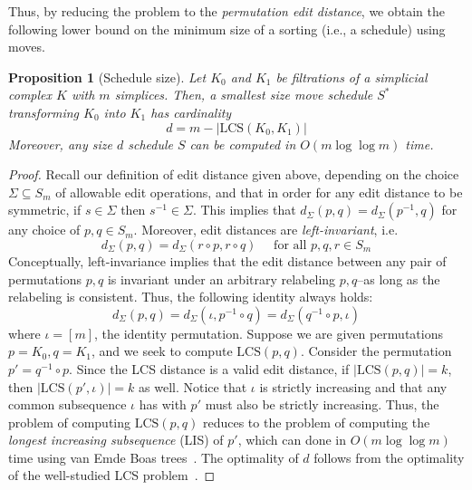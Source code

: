 \documentclass{article} %
\newtheorem{proposition}{Proposition}
\newtheorem{proof}{Proof}
\begin{document}
%
Thus, by reducing the problem to the \emph{permutation edit distance}, we obtain the following lower bound on the minimum size of a sorting (i.e., a schedule) using moves. 
\begin{proposition}[Schedule size]
Let $K_0$ and $ K_1$ be filtrations of a simplicial complex $K$ with  $m$ simplices.
Then, a smallest size  move schedule $S^*$ transforming $K_0$ into $K_1$ has cardinality 
$$ d = m - \lvert \mathrm{LCS}(K_0, K_1) \rvert $$ 
Moreover, any size $d$ schedule $S$ can be computed in $O(m \log \log m)$ time. 
\end{proposition}
\begin{proof}
Recall our definition of  edit distance given above, 
depending on the choice   $\Sigma \subseteq S_m$ of allowable edit operations, and that in order for any edit distance to be symmetric, if $s \in \Sigma$ then $s^{-1} \in \Sigma$. This implies that $d_\Sigma(p,q) = d_\Sigma(p^{-1}, q)$ for any choice of  $p,q \in S_m$. 
Moreover, edit distances are \emph{left-invariant}, i.e.
\[
d_\Sigma(p,q) = d_\Sigma(r \circ p, r \circ q) \quad \text{ for all } p,q,r \in S_m
\]
Conceptually, left-invariance implies that the edit distance between any pair of permutations $p,q$ is invariant under an arbitrary relabeling $p,q$--as long as the relabeling is consistent. Thus, the following identity always holds: 
$$ d_\Sigma(p,q) = d_\Sigma(\iota, p^{-1} \circ q) = d_\Sigma(q^{-1} \circ p, \iota) $$
where $\iota = [m]$, the identity permutation. Suppose we are given permutations $p = K_0, q = K_1$, and we seek to compute $\mathrm{LCS}(p, q)$. Consider the permutation $p' = q^{-1} \circ p$. Since the LCS distance is a valid edit distance, if $\lvert \mathrm{LCS}(p, q) \rvert = k$, then $\lvert \mathrm{LCS}(p', \iota) \rvert = k$ as well. Notice that $\iota$ is strictly increasing and that any common subsequence $\iota$ has with $p'$ must also be strictly increasing. Thus, the problem of computing $\mathrm{LCS}(p, q)$ reduces to the problem of computing the \emph{longest increasing subsequence} (LIS) of $p'$, which can done in $O( m \log \log m)$ time using van Emde Boas trees~\cite{bespamyatnikh2000enumerating}. The optimality of $d$ follows from the optimality of the well-studied LCS problem~\cite{kumar1987linear}. 
\end{proof}
\end{document}
